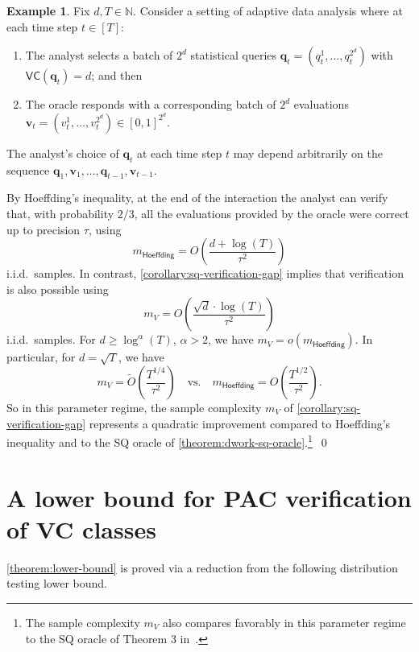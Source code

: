 \documentclass[11pt]{article}
\numberwithin{equation}{section}
\theoremstyle{definition}
\newtheorem{example}[theorem]{Example}
\theoremstyle{plain}
\theoremstyle{definition}\newtheorem{notation}[theorem]{Notation}\theoremstyle{plain}\raggedbottom
\newcommand{\roundBrackets}[1]{
	\mathopen{}\left(#1\right)\mathclose{}
}
\newcommand{\customFunctionRound}[2]{
	#1\roundBrackets{#2}
}
\newcommand{\sfFunction}[2]{
	\customFunctionRound{\mathsf{#1}}{#2}
}
\newcommand{\BigO}[1]{O\roundBrackets{#1}}
\newcommand{\tildeBigO}[1]{\widetilde{O}\roundBrackets{#1}}
\newcommand{\VC}[1]{\sfFunction{VC}{#1}}
\newcommand{\bbN}{\mathbb{N}}
\newcommand{\bq}{\mathbf{q}}
\newcommand{\bv}{\mathbf{v}}
\newcommand{\1}{\mathds{1}}
\newcommand{\mV}{m_{\scriptscriptstyle V}}
\begin{document}
\begin{example}
	Fix $d,T \in \bbN$. Consider a setting of adaptive data analysis where at each time step $t \in [T]$:
	\begin{enumerate}
		\item{
			The analyst selects a batch of $2^d$ statistical queries $\bq_t = \left(q_t^1,\dots,q_t^{2^d}\right)$ with $\VC{\bq_t} = d$; and then
		}
		\item{
			The oracle responds with a corresponding batch of $2^d$ evaluations $\bv_t = \left(v_t^1,\dots,v_t^{2^d}\right) \in [0,1]^{2^d}$.
		}
	\end{enumerate}
	The analyst's choice of $\bq_t$ at each time step $t$ may depend arbitrarily on the sequence $\bq_1,\bv_1,\dots,\allowbreak\bq_{t-1},\allowbreak\bv_{t-1}$.

	By Hoeffding's inequality, at the end of the interaction the analyst can verify that, with probability $2/3$, all the evaluations provided by the oracle were correct up to precision $\tau$, using 
	\[
		m_{\mathsf{Hoeffding}} = \BigO{\frac{d + \log(T)}{\tau^2}}
	\]
	i.i.d.\ samples. In contrast, \cref{corollary:sq-verification-gap} implies that verification is also possible using
	\[
		\mV = \BigO{
			\frac{
				\sqrt{d}\cdot \log(T)
			}{
				\tau^2
			}
		}
	\]
	i.i.d.\ samples. For $d \geq \log^\alpha(T)$, $\alpha > 2$, we have $\mV = o(m_{\mathsf{Hoeffding}})$. In particular, for $d = \sqrt{T}$, we have 
	\[
		\mV = \tildeBigO{\frac{T^{1/4}}{\tau^2}}
		 \quad \text{vs.} \quad
		m_{\mathsf{Hoeffding}} = \BigO{\frac{T^{1/2}}{\tau^2}}.
	\]
	So in this parameter regime, the sample complexity $\mV$ of \cref{corollary:sq-verification-gap} represents a quadratic improvement compared to Hoeffding's inequality and to the SQ oracle of \cref{theorem:dwork-sq-oracle}.\footnote{
		The sample complexity $\mV$ also compares favorably in this parameter regime to the SQ oracle of Theorem 3 in~\cite{DBLP:conf/stoc/DworkFHPRR15}. 
	}~\qed
\end{example}



\section{A lower bound for PAC verification of VC classes}
\label{section:lower-bound}

\cref{theorem:lower-bound} is proved via a reduction from the following distribution testing lower bound.
\end{document}
